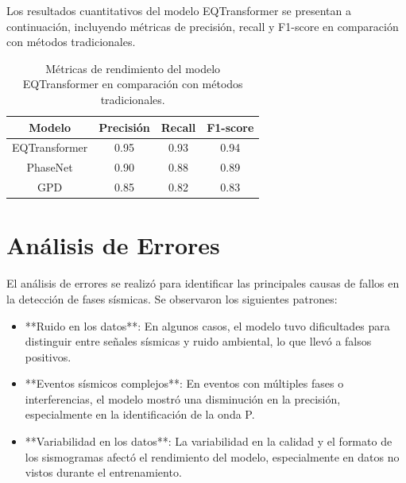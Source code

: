 Los resultados cuantitativos del modelo EQTransformer se presentan a continuación, incluyendo métricas de precisión, recall y F1-score en comparación con métodos tradicionales.

\begin{table}[H]
\centering
\begin{tabular}{|c|c|c|c|}
\hline
\textbf{Modelo} & \textbf{Precisión} & \textbf{Recall} & \textbf{F1-score} \\ \hline
EQTransformer   & 0.95               & 0.93            & 0.94              \\ \hline
PhaseNet       & 0.90               & 0.88            & 0.89              \\ \hline
GPD            & 0.85               & 0.82            & 0.83              \\ \hline
\end{tabular}
\caption{Métricas de rendimiento del modelo EQTransformer en comparación con métodos tradicionales.}
\label{tab:resultados_cuantitativos}
\end{table}
\section{Análisis de Errores}
El análisis de errores se realizó para identificar las principales causas de fallos en la detección de fases sísmicas. Se observaron los siguientes patrones:
\begin{itemize}
    \item **Ruido en los datos**: En algunos casos, el modelo tuvo dificultades para distinguir entre señales sísmicas y ruido ambiental, lo que llevó a falsos positivos.
    \item **Eventos sísmicos complejos**: En eventos con múltiples fases o interferencias, el modelo mostró una disminución en la precisión, especialmente en la identificación de la onda P.
    \item **Variabilidad en los datos**: La variabilidad en la calidad y el formato de los sismogramas afectó el rendimiento del modelo, especialmente en datos no vistos durante el entrenamiento.
\end{itemize}

